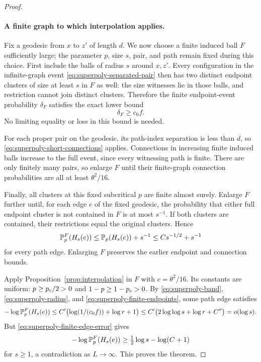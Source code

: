 \begin{proof}
\paragraph{A finite graph to which interpolation applies.}
Fix a geodesic from $x$ to $z'$ of length $d$. We now choose a finite
induced ball $F$ sufficiently large; the parameter $p$, size $s$,
pair, and path remain fixed during this choice.
First include the balls of radius $s$ around $x,z'$. Every configuration
in the infinite-graph event \eqref{eq:superpoly-separated-pair} then
has two distinct endpoint clusters of size at least $s$ in $F$ as
well: the size witnesses lie in those balls, and restriction cannot
join distinct clusters. Therefore the finite endpoint-event probability
$\delta_F$ satisfies the exact lower bound
\begin{equation}\label{eq:superpoly-finite-endpoints}
 \delta_F\ge c_0f.
\end{equation}
No limiting equality or loss in this bound is needed.

For each proper pair on the geodesic, its path-index separation is
less than $d$, so \eqref{eq:superpoly-short-connections} applies.
Connections in increasing finite induced balls increase to the full
event, since every witnessing path is finite. There are only finitely
many pairs, so enlarge $F$ until their finite-graph connection
probabilities are all at least $\theta^2/16$.

Finally, all clusters at this fixed subcritical $p$ are finite almost
surely. Enlarge $F$ further until, for each edge $e$ of the fixed
geodesic, the probability that either full endpoint cluster is not
contained in $F$ is at most $s^{-1}$. If both clusters are contained,
their restrictions equal the original clusters. Hence
\begin{equation}\label{eq:superpoly-finite-edge-error}
 \mathbb P_p^F(H_s(e))
 \le\mathbb P_p(H_s(e))+s^{-1}
 \le Cs^{-1/2}+s^{-1}
\end{equation}
for every path edge. Enlarging $F$ preserves the earlier endpoint
and connection bounds.

Apply Proposition~\ref{prop:interpolation} in $F$ with
$c=\theta^2/16$. Its constants are uniform: $p\ge p_c/2>0$ and
$1-p\ge1-p_c>0$. By \eqref{eq:superpoly-band},
\eqref{eq:superpoly-radius}, and
\eqref{eq:superpoly-finite-endpoints}, some path edge satisfies
\[
 -\log\mathbb P_p^F(H_s(e))
 \le C'\bigl(\log(1/(c_0f))+\log r+1\bigr)
 \le C'\bigl(2\log\log s+\log r+C''\bigr)
 =o(\log s).
\]
But \eqref{eq:superpoly-finite-edge-error} gives
\[
 -\log\mathbb P_p^F(H_s(e))
 \ge\tfrac12\log s-\log(C+1)
\]
for $s\ge1$, a contradiction as $L\to\infty$.
This proves the theorem.
\end{proof}
